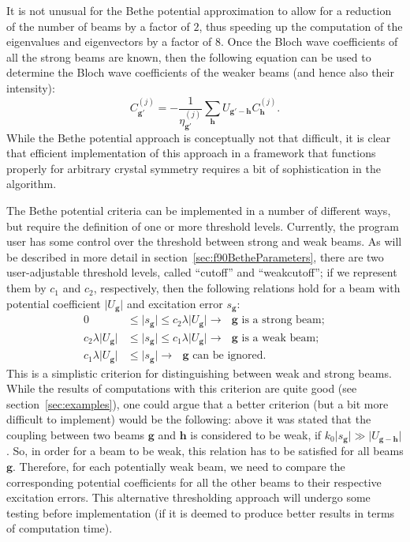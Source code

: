 \documentclass[DIV=calc, paper=letter, fontsize=11pt]{scrartcl}	 %
\newcommand{\ughp}[2]{U_{\mathbf{#1}'-\mathbf{#2}}}
\newcommand{\Cgj}[2]{C_{\mathbf{#1}}^{(#2)}}
\newcommand{\Cgjp}[2]{C_{\mathbf{#1}'}^{(#2)}}
\begin{document}
It is not unusual for the Bethe potential approximation to allow for a 
reduction of the number of beams by a factor of $2$, thus speeding up
the computation of the eigenvalues and eigenvectors by a factor of $8$.
Once the Bloch wave coefficients of all the strong beams are known, then 
the following equation can be used to determine the Bloch wave coefficients of the weaker 
beams (and hence also their intensity):
\begin{equation}
    \Cgjp{g}{j} = -\frac{1}{\eta^{(j)}_{\mathbf{g}'}}
    \sum_{\mathbf{h}}\ughp{g}{h}\Cgj{h}{j}.\label{eq:weakCgj}
\end{equation}
While the Bethe potential approach is conceptually not that difficult, it is clear that efficient implementation 
of this approach in a framework that functions properly for arbitrary crystal symmetry
requires a bit of sophistication in the algorithm.

The Bethe potential criteria can be implemented in a number of different ways, but 
require the definition of one or more threshold levels.  Currently,
the program user has some control over the threshold between strong and weak beams. 
As will be described in more detail in section~\ref{sec:f90BetheParameters}, there are two user-adjustable 
threshold levels, called ``\textsf{cutoff}'' and ``\textsf{weakcutoff}''; if we represent
them by $c_1$ and $c_2$, respectively, then the following relations hold for a beam 
with potential coefficient $\vert U_{\mathbf{g}}\vert$ and excitation error $s_{\mathbf{g}}$:
\begin{align*}
	0 & \le  \vert s_{\mathbf{g}}\vert \le c_2\lambda\vert U_{\mathbf{g}}\vert\rightarrow \text{ $\mathbf{g}$ is a strong beam};\\
	c_2\lambda\vert U_{\mathbf{g}}\vert &\le \vert s_{\mathbf{g}}\vert \le c_1\lambda\vert U_{\mathbf{g}}\vert\rightarrow \text{ $\mathbf{g}$ is a weak beam};\\
	c_1\lambda\vert U_{\mathbf{g}}\vert &\le \vert s_{\mathbf{g}}\vert \rightarrow\text{ $\mathbf{g}$ can be ignored}.
\end{align*}
This is a simplistic criterion for distinguishing between weak and strong beams.  While the results of computations with this criterion
are quite good (see section~\ref{sec:examples}), one could argue that a better criterion (but a bit more difficult to implement) 
would be the following:  above it was stated that the coupling between two beams $\mathbf{g}$ and $\mathbf{h}$ is considered 
to be weak, if $k_0\vert s_{\mathbf{g}}\vert \gg \vert U_{\mathbf{g}-\mathbf{h}}\vert$.  So, in order for a beam to be weak, this relation
has to be satisfied for all beams $\mathbf{g}$.  Therefore, for each potentially weak beam, we need to compare the corresponding 
potential coefficients for all the other beams to their respective excitation errors.  This alternative thresholding approach will undergo
some testing before implementation (if it is deemed to produce better results in terms of computation time).  
\end{document}
